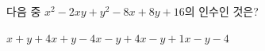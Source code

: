 다음 중 $x^2-2xy+y^2-8x+8y+16$의 인수인 것은?
\begin{choices32}{$x+y+4$}{$x+y-4$}{$x-y+4$}{$x-y+1$}{$x-y-4$}\end{choices32}
